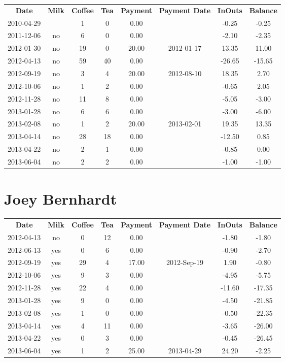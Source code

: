 \begin{center}
\begin{tabular}{cccccccc}
\textbf{Date} & \textbf{Milk} & \textbf{Coffee} & \textbf{Tea} & \textbf{Payment} & \textbf{Payment Date} & \textbf{InOuts} & \textbf{Balance} \\
2010-04-29 &  &  1 &  0 &  0.00 &  &  -0.25 &  -0.25\\ 
2011-12-06 & no &  6 &  0 &  0.00 &  &  -2.10 &  -2.35\\ 
2012-01-30 & no & 19 &  0 & 20.00 & 2012-01-17 &  13.35 &  11.00\\ 
2012-04-13 & no & 59 & 40 &  0.00 &  & -26.65 & -15.65\\ 
2012-09-19 & no &  3 &  4 & 20.00 & 2012-08-10 &  18.35 &   2.70\\ 
2012-10-06 & no &  1 &  2 &  0.00 &  &  -0.65 &   2.05\\ 
2012-11-28 & no & 11 &  8 &  0.00 &  &  -5.05 &  -3.00\\ 
2013-01-28 & no &  6 &  6 &  0.00 &  &  -3.00 &  -6.00\\ 
2013-02-08 & no &  1 &  2 & 20.00 & 2013-02-01 &  19.35 &  13.35\\ 
2013-04-14 & no & 28 & 18 &  0.00 &  & -12.50 &   0.85\\ 
2013-04-22 & no &  2 &  1 &  0.00 &  &  -0.85 &   0.00\\ 
2013-06-04 & no &  2 &  2 &  0.00 &  &  -1.00 &  -1.00
\end{tabular}
\end{center}

\section{Joey Bernhardt}

\begin{center}
\begin{tabular}{cccccccc}
\textbf{Date} & \textbf{Milk} & \textbf{Coffee} & \textbf{Tea} & \textbf{Payment} & \textbf{Payment Date} & \textbf{InOuts} & \textbf{Balance} \\
2012-04-13 & no &  0 & 12 &  0.00 &  &  -1.80 &  -1.80\\ 
2012-06-13 & yes &  0 &  6 &  0.00 &  &  -0.90 &  -2.70\\ 
2012-09-19 & yes & 29 &  4 & 17.00 & 2012-Sep-19 &   1.90 &  -0.80\\ 
2012-10-06 & yes &  9 &  3 &  0.00 &  &  -4.95 &  -5.75\\ 
2012-11-28 & yes & 22 &  4 &  0.00 &  & -11.60 & -17.35\\ 
2013-01-28 & yes &  9 &  0 &  0.00 &  &  -4.50 & -21.85\\ 
2013-02-08 & yes &  1 &  0 &  0.00 &  &  -0.50 & -22.35\\ 
2013-04-14 & yes &  4 & 11 &  0.00 &  &  -3.65 & -26.00\\ 
2013-04-22 & yes &  0 &  3 &  0.00 &  &  -0.45 & -26.45\\ 
2013-06-04 & yes &  1 &  2 & 25.00 & 2013-04-29 &  24.20 &  -2.25
\end{tabular}
\end{center}

